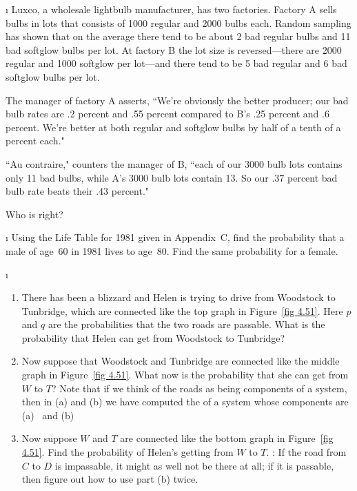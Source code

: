 \begin{LJSItem}
\i\label{exer 4.1.28} Luxco, a wholesale lightbulb manufacturer, has two factories.  Factory A
sells bulbs in lots that consists of 1000 regular and 2000 
bulbs each.  Random sampling has shown that on the average there tend to be
about 2 bad regular bulbs and 11 bad softglow bulbs per lot.  At factory B the
lot size is reversed---there are 2000 regular and 1000 softglow per lot---and
there tend to be 5 bad regular and 6 bad softglow bulbs per lot.

The manager of factory A asserts, ``We're obviously the better producer; our
bad bulb rates are .2 percent and .55 percent compared to B's .25 percent and
.6 percent.  We're better at both regular and softglow bulbs by half of a tenth
of a percent each."

``Au contraire," counters the manager of B, ``each of our 3000 bulb lots
contains only 11 bad bulbs, while A's 3000 bulb lots contain 13.  So our .37
percent bad bulb rate beats their .43 percent."
\par
Who is right?

\i\label{exer 4.1.29} Using the Life Table for 1981 given in Appendix~C, find the
probability that a male of age~60 in 1981 lives to age~80.  Find the same
probability for a female.

\i\label{exer 4.1.30}
\begin{enumerate}
\item There has been a blizzard and Helen is trying to drive from Woodstock
to Tunbridge, which are connected like the top graph in Figure~\ref{fig
4.51}.  Here $p$ and $q$ are the probabilities that the two roads are passable.  What
is the probability that Helen can get from Woodstock to Tunbridge?

\item Now suppose that Woodstock and Tunbridge are connected like the middle graph 
in Figure~\ref{fig 4.51}.
What now is the probability that she can get from $W$ to $T$?  Note that if we
think of the roads as being components of a system, then in
(a) and (b) we have computed the
 of a system whose components are (a)~ and (b)~

\item Now suppose $W$ and $T$ are connected like the bottom graph in Figure~\ref{fig 4.51}.
Find the probability of Helen's getting from $W$ to $T$.  : If the
road from $C$ to $D$ is impassable, it might as well not be there at all; if it
is passable, then figure out how to use part (b) twice.
\end{enumerate}


\end{LJSItem}
